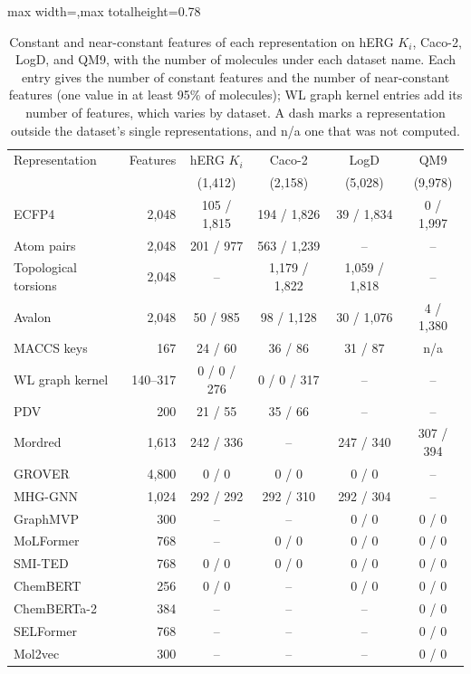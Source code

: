 \clearpage
{}
\label{app:add:constant_features}
\begin{table}[htbp]
\centering
\small
\setlength{\tabcolsep}{4pt}
\begin{adjustbox}{max width=\textwidth,max totalheight=0.78\textheight}
\begin{tabular}{lrcccc}
\toprule
Representation & Features & hERG $K_i$ & Caco-2 & LogD & QM9 \\
 & & (1,412) & (2,158) & (5,028) & (9,978) \\
\midrule
ECFP4 & 2,048 & 105 / 1,815 & 194 / 1,826 & 39 / 1,834 & 0 / 1,997 \\
Atom pairs & 2,048 & 201 / 977 & 563 / 1,239 & -- & -- \\
Topological torsions & 2,048 & -- & 1,179 / 1,822 & 1,059 / 1,818 & -- \\
Avalon & 2,048 & 50 / 985 & 98 / 1,128 & 30 / 1,076 & 4 / 1,380 \\
MACCS keys & 167 & 24 / 60 & 36 / 86 & 31 / 87 & n/a \\
WL graph kernel & 140--317 & 0 / 0 / 276 & 0 / 0 / 317 & -- & -- \\
PDV & 200 & 21 / 55 & 35 / 66 & -- & -- \\
Mordred & 1,613 & 242 / 336 & -- & 247 / 340 & 307 / 394 \\
GROVER & 4,800 & 0 / 0 & 0 / 0 & 0 / 0 & -- \\
MHG-GNN & 1,024 & 292 / 292 & 292 / 310 & 292 / 304 & -- \\
GraphMVP & 300 & -- & -- & 0 / 0 & 0 / 0 \\
MoLFormer & 768 & -- & 0 / 0 & 0 / 0 & 0 / 0 \\
SMI-TED & 768 & 0 / 0 & 0 / 0 & 0 / 0 & 0 / 0 \\
ChemBERT & 256 & 0 / 0 & -- & 0 / 0 & 0 / 0 \\
ChemBERTa-2 & 384 & -- & -- & -- & 0 / 0 \\
SELFormer & 768 & -- & -- & -- & 0 / 0 \\
Mol2vec & 300 & -- & -- & -- & 0 / 0 \\
\bottomrule
\end{tabular}
\end{adjustbox}
\caption[Constant and near-constant features per representation, part 1.]{Constant and near-constant features of each representation on hERG $K_i$, Caco-2, LogD, and QM9, with the number of molecules under each dataset name. Each entry gives the number of constant features and the number of near-constant features (one value in at least 95\% of molecules); WL graph kernel entries add its number of features, which varies by dataset. A dash marks a representation outside the dataset's single representations, and n/a one that was not computed.}
\label{tab:constant_features}
\end{table}

